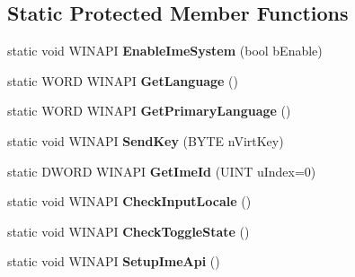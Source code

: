 \subsection*{Static Protected Member Functions}
\begin{DoxyCompactItemize}
\item 
\hypertarget{class_c_d_x_u_t_i_m_e_edit_box_ae8f7bd48b81e44c434a14107f8d36076}{static void W\+I\+N\+A\+P\+I {\bfseries Enable\+Ime\+System} (bool b\+Enable)}\label{class_c_d_x_u_t_i_m_e_edit_box_ae8f7bd48b81e44c434a14107f8d36076}

\item 
\hypertarget{class_c_d_x_u_t_i_m_e_edit_box_af6664403bab9322b622951e5e04f03cc}{static W\+O\+R\+D W\+I\+N\+A\+P\+I {\bfseries Get\+Language} ()}\label{class_c_d_x_u_t_i_m_e_edit_box_af6664403bab9322b622951e5e04f03cc}

\item 
\hypertarget{class_c_d_x_u_t_i_m_e_edit_box_a658272c7ed70cfdda16f2bb17e9aba5c}{static W\+O\+R\+D W\+I\+N\+A\+P\+I {\bfseries Get\+Primary\+Language} ()}\label{class_c_d_x_u_t_i_m_e_edit_box_a658272c7ed70cfdda16f2bb17e9aba5c}

\item 
\hypertarget{class_c_d_x_u_t_i_m_e_edit_box_a41a841ff166e8221dd4a82c58661790f}{static void W\+I\+N\+A\+P\+I {\bfseries Send\+Key} (B\+Y\+T\+E n\+Virt\+Key)}\label{class_c_d_x_u_t_i_m_e_edit_box_a41a841ff166e8221dd4a82c58661790f}

\item 
\hypertarget{class_c_d_x_u_t_i_m_e_edit_box_ac1c3d7097734f3b7bd7a836b0106cbbc}{static D\+W\+O\+R\+D W\+I\+N\+A\+P\+I {\bfseries Get\+Ime\+Id} (U\+I\+N\+T u\+Index=0)}\label{class_c_d_x_u_t_i_m_e_edit_box_ac1c3d7097734f3b7bd7a836b0106cbbc}

\item 
\hypertarget{class_c_d_x_u_t_i_m_e_edit_box_ac412b5529923009767ce0b7db85265bf}{static void W\+I\+N\+A\+P\+I {\bfseries Check\+Input\+Locale} ()}\label{class_c_d_x_u_t_i_m_e_edit_box_ac412b5529923009767ce0b7db85265bf}

\item 
\hypertarget{class_c_d_x_u_t_i_m_e_edit_box_aa2244edd93622769ca515bbbcc395c1c}{static void W\+I\+N\+A\+P\+I {\bfseries Check\+Toggle\+State} ()}\label{class_c_d_x_u_t_i_m_e_edit_box_aa2244edd93622769ca515bbbcc395c1c}

\item 
\hypertarget{class_c_d_x_u_t_i_m_e_edit_box_aeba2e4b468f5211eb82b508a745bc8ad}{static void W\+I\+N\+A\+P\+I {\bfseries Setup\+Ime\+Api} ()}\label{class_c_d_x_u_t_i_m_e_edit_box_aeba2e4b468f5211eb82b508a745bc8ad}


\end{DoxyCompactItemize}
